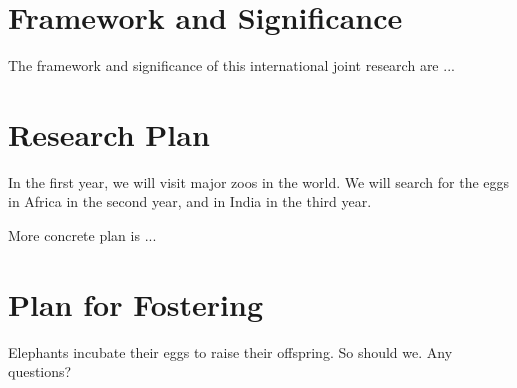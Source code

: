 \documentclass[11pt,a4paper,dvipdfmx]{article} 		%
\newcommand{\研究課題名}{象の卵}
\newcommand{\研究機関名}{逢坂大学}
\newcommand{\研究代表者氏名}{湯川秀樹}
\begin{document}

\section{Framework and Significance}

\JSPSInstructions	%

	The framework and significance of this international joint research
	are ...



\section{Research Plan}


	In the first year, we will visit major zoos in the world.
	We will search for the eggs in Africa in the second year, 
	and in India in the third year.

	More concrete plan is ...




\section{Plan for Fostering}


	Elephants incubate their eggs to raise their offspring.
	So should we.
	Any questions?
	
	



\end{document}

